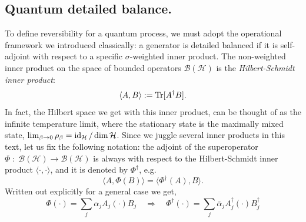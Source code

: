 \smallskip
\label{parag:qdb}
\subsection{Quantum detailed balance.} To define reversibility for a quantum process, we must adopt the operational framework we introduced classically: a generator is detailed balanced if it is self-adjoint with respect to a specific $\sigma$-weighted inner product. The non-weighted inner product on the space of bounded operators $\mathcal{B(H)}$ is the \textit{Hilbert-Schmidt inner product}:
\begin{equation}
    \label{eq:HS}
    \langle A, B \rangle := \operatorname{Tr}[A^\dagger B].
\end{equation}
In fact, the Hilbert space we get with this inner product, can be thought of as the infinite temperature limit, where the stationary state is the maximally mixed state, $\lim_{\beta\rightarrow 0}\rho_\beta = \operatorname{id}_\mathcal{H} / \dim \mathcal{H}$. Since we juggle several inner products in this text, let us fix the following notation: the adjoint of the superoperator $\Phi\;:\;\mathcal{B(H)}\rightarrow\mathcal{B(H)}$ is always with respect to the Hilbert-Schmidt inner product $\langle \cdot,\cdot\rangle$, and it is denoted by $\Phi^\dagger$, e.g. 
\begin{equation}
    \langle A, \Phi(B) \rangle = \langle \Phi^\dagger(A), B \rangle.
\end{equation}
Written out explicitly for a general case we get,
\begin{equation}
    \Phi(\cdot) = \sum_j \alpha_j A_j (\cdot) B_j \quad\Rightarrow\quad \Phi^\dagger(\cdot) = \sum_j \bar{\alpha}_j A^\dagger_j (\cdot) B^\dagger_j
\end{equation}

